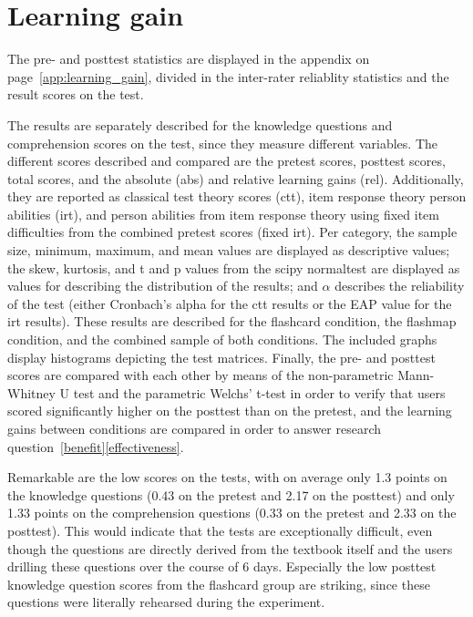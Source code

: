 \section{Learning gain}

The pre- and posttest statistics are displayed in the  appendix on page~\ref{app:learning_gain}, divided in the inter-rater reliablity statistics and the result scores on the test. 

The results are separately described for the knowledge questions and comprehension scores on the test, since they measure different variables. The different scores described and compared are the pretest scores, posttest scores, total scores, and the absolute (abs) and relative learning gains (rel). Additionally, they are reported as classical test theory scores (ctt), item response theory person abilities (irt), and person abilities from item response theory using fixed item difficulties from the combined pretest scores (fixed irt). Per category, the sample size, minimum, maximum, and mean values are displayed as descriptive values; the skew, kurtosis, and t and p values from the scipy normaltest are displayed as values for describing the distribution of the results; and $\alpha$ describes the reliability of the test (either Cronbach's alpha for the ctt results or the EAP value for the irt results). These results are described for the flashcard condition, the flashmap condition, and the combined sample of both conditions. The included graphs display histograms depicting the test matrices. Finally, the pre- and posttest scores are compared with each other by means of the non-parametric Mann-Whitney U test and the parametric Welchs' t-test in order to verify that users scored significantly higher on the posttest than on the pretest, and the learning gains between conditions are compared in order to answer research question~\ref{benefit}\ref{effectiveness}.

Remarkable are the low scores on the tests, with on average only 1.3 points on the knowledge questions (0.43 on the pretest and 2.17 on the posttest) and only 1.33 points on the comprehension questions (0.33 on the pretest and 2.33 on the posttest). This would indicate that the tests are exceptionally difficult, even though the questions are directly derived from the textbook itself and the users drilling these questions over the course of 6 days. Especially the low posttest knowledge question scores from the flashcard group are striking, since these questions were literally rehearsed during the experiment.

